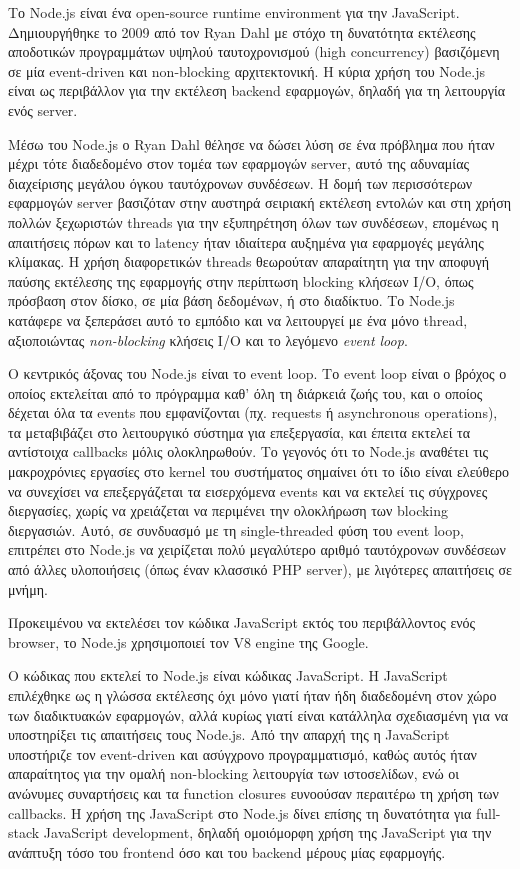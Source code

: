 \documentclass[../thesis.tex]{subfiles}
\begin{document}
Το Node.js είναι ένα open-source runtime environment για την JavaScript.
Δημιουργήθηκε το 2009 από τον Ryan Dahl με στόχο τη δυνατότητα εκτέλεσης αποδοτικών προγραμμάτων υψηλού ταυτοχρονισμού (high concurrency) βασιζόμενη σε μία event-driven και non-blocking αρχιτεκτονική.
Η κύρια χρήση του Node.js είναι ως περιβάλλον για την εκτέλεση backend εφαρμογών, δηλαδή για τη λειτουργία ενός server.

Μέσω του Node.js ο Ryan Dahl θέλησε να δώσει λύση σε ένα πρόβλημα που ήταν μέχρι τότε διαδεδομένο στον τομέα των εφαρμογών server, αυτό της αδυναμίας διαχείρισης μεγάλου όγκου ταυτόχρονων συνδέσεων.
Η δομή των περισσότερων εφαρμογών server βασιζόταν στην αυστηρά σειριακή εκτέλεση εντολών και στη χρήση πολλών ξεχωριστών threads για την εξυπηρέτηση όλων των συνδέσεων, επομένως η απαιτήσεις πόρων και το latency ήταν ιδιαίτερα αυξημένα για εφαρμογές μεγάλης κλίμακας.
Η χρήση διαφορετικών threads θεωρούταν απαραίτητη για την αποφυγή παύσης εκτέλεσης της εφαρμογής στην περίπτωση blocking κλήσεων I/O, όπως πρόσβαση στον δίσκο, σε μία βάση δεδομένων, ή στο διαδίκτυο.
Το Node.js κατάφερε να ξεπεράσει αυτό το εμπόδιο και να λειτουργεί με ένα μόνο thread, αξιοποιώντας \textit{non-blocking} κλήσεις I/O και το λεγόμενο \textit{event loop}.

Ο κεντρικός άξονας του Node.js είναι το event loop.
Το event loop είναι ο βρόχος ο οποίος εκτελείται από το πρόγραμμα καθ' όλη τη διάρκειά ζωής του, και ο οποίος δέχεται όλα τα events που εμφανίζονται (πχ. requests ή asynchronous operations), τα μεταβιβάζει στο λειτουργικό σύστημα για επεξεργασία, και έπειτα εκτελεί τα αντίστοιχα callbacks μόλις ολοκληρωθούν.
Το γεγονός ότι το Node.js αναθέτει τις μακροχρόνιες εργασίες στο kernel του συστήματος σημαίνει ότι το ίδιο είναι ελεύθερο να συνεχίσει να επεξεργάζεται τα εισερχόμενα events και να εκτελεί τις σύγχρονες διεργασίες, χωρίς να χρειάζεται να περιμένει την ολοκλήρωση των blocking διεργασιών.
Αυτό, σε συνδυασμό με τη single-threaded φύση του event loop, επιτρέπει στο Node.js να χειρίζεται πολύ μεγαλύτερο αριθμό ταυτόχρονων συνδέσεων από άλλες υλοποιήσεις (όπως έναν κλασσικό PHP server), με λιγότερες απαιτήσεις σε μνήμη.

Προκειμένου να εκτελέσει τον κώδικα JavaScript εκτός του περιβάλλοντος ενός browser, το Node.js χρησιμοποιεί τον V8 engine της Google.

Ο κώδικας που εκτελεί το Node.js είναι κώδικας JavaScript.
Η JavaScript επιλέχθηκε ως η γλώσσα εκτέλεσης όχι μόνο γιατί ήταν ήδη διαδεδομένη στον χώρο των διαδικτυακών εφαρμογών, αλλά κυρίως γιατί είναι κατάλληλα σχεδιασμένη για να υποστηρίξει τις απαιτήσεις τους Node.js.
Από την απαρχή της η JavaScript υποστήριζε τον event-driven και ασύγχρονο προγραμματισμό, καθώς αυτός ήταν απαραίτητος για την ομαλή non-blocking λειτουργία των ιστοσελίδων, ενώ οι ανώνυμες συναρτήσεις και τα function closures ευνοούσαν περαιτέρω τη χρήση των callbacks.
Η χρήση της JavaScript στο Node.js δίνει επίσης τη δυνατότητα για full-stack JavaScript development, δηλαδή ομοιόμορφη χρήση της JavaScript για την ανάπτυξη τόσο του frontend όσο και του backend μέρους μίας εφαρμογής.
\end{document}
